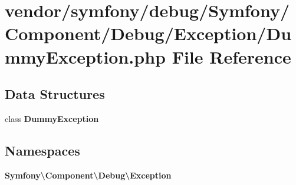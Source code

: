 \section{vendor/symfony/debug/\+Symfony/\+Component/\+Debug/\+Exception/\+Dummy\+Exception.php File Reference}
\label{symfony_2debug_2_symfony_2_component_2_debug_2_exception_2_dummy_exception_8php}
\subsection*{Data Structures}
\begin{DoxyCompactItemize}
\item 
class {\bf Dummy\+Exception}
\end{DoxyCompactItemize}
\subsection*{Namespaces}
\begin{DoxyCompactItemize}
\item 
 {\bf Symfony\textbackslash{}\+Component\textbackslash{}\+Debug\textbackslash{}\+Exception}
\end{DoxyCompactItemize}
